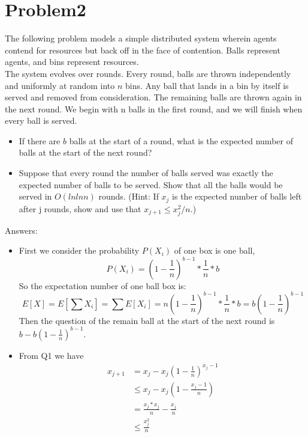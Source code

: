 \documentclass[12pt]{article}
\begin{document}
\section{Problem2}
The following problem models a simple distributed system wherein agents contend for resources but back off in the face of contention. Balls represent agents, and bins represent resources.\\
The system evolves over rounds. Every round, balls are thrown independently and uniformly at random into $n$ bins. Any ball that lands in a bin by itself is served and removed from consideration. The remaining balls are thrown again in the next round. We begin with n balls in the first round, and we will finish when every ball is served.
\begin{itemize}
\item If there are $b$ balls at the start of a round, what is the expected number of balls at the start of the next round?
\item Suppose that every round the number of balls served was exactly the expected number of balls to be served. Show that all the balls would be served in $O(ln ln n)$ rounds. (Hint: If $x_j$ is the expected number of balls left after j rounds, show and use that $x_{j+1} \le x^2_j/n$.)

\end{itemize}

Answers:
\begin{itemize}
\item First we consider the probability $P(X_i)$ of one box is one ball,
\begin{equation}
    P(X_i) = (1-\frac{1}{n})^{b-1}*\frac{1}{n}*b
\end{equation}
So the expectation number of one ball box is:
\begin{equation}
    E[X] = E[\sum X_i] = \sum E[X_i] = n(1-\frac{1}{n})^{b-1}*\frac{1}{n}*b = b(1-\frac{1}{n})^{b-1}
\end{equation}
Then the question of the remain ball at the start of the next round is $b-b(1-\frac{1}{n})^{b-1}$.

\item
From Q1 we have 
\begin{equation}
    \begin{split}
    x_{j+1} &= x_j - x_j(1-\frac{1}{n})^{x_j-1}\\
    &\le x_j - x_j (1-\frac{x_j-1}{n})\\
    &= \frac{x_j*x_j}{n}-\frac{x_j}{n}\\
    &\le \frac{x_j^2}{n}
    \end{split}
\end{equation}
\end{itemize}
\end{document}
